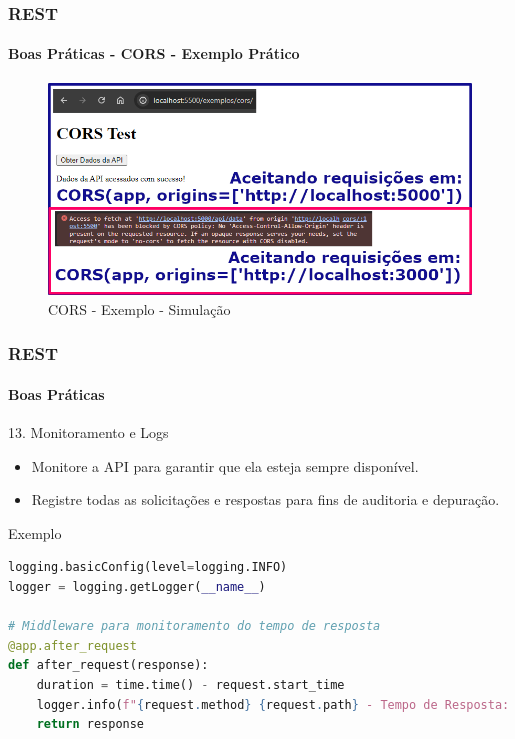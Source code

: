 \documentclass[
	9pt, %
	t, %
]{beamer}
\begin{document}
\begin{frame}
	\frametitle{REST}
	\framesubtitle{Boas Práticas - CORS - Exemplo Prático}

	\begin{figure}
		\includegraphics[width=0.9\linewidth]{cors_test.png}
		\caption{CORS - Exemplo - Simulação}
		\label{fig:cors_example_test}
	\end{figure}

\end{frame}

\begin{frame}[fragile]
	\frametitle{REST}
	\framesubtitle{Boas Práticas}

	\begin{block}{13. Monitoramento e Logs}
		\begin{itemize}
			\item Monitore a API para garantir que ela esteja sempre disponível.
			\item Registre todas as solicitações e respostas para fins de auditoria e depuração.
		\end{itemize}
	\end{block}

	\begin{exampleblock}{Exemplo}
		\begin{lstlisting}[language=Python, basicstyle=\small]
logging.basicConfig(level=logging.INFO)
logger = logging.getLogger(__name__)

# Middleware para monitoramento do tempo de resposta
@app.after_request
def after_request(response):
	duration = time.time() - request.start_time
	logger.info(f"{request.method} {request.path} - Tempo de Resposta: {duration:.3f}s")
	return response
		\end{lstlisting}

	\end{exampleblock}

\end{frame}
\end{document}
